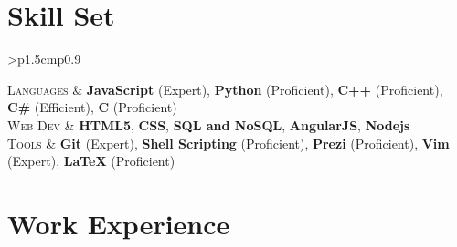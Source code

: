 \documentclass[a4paper,10pt]{article} %
\newcommand{\itemlist}[1]{
    \begin{tabular}{>{\raggedleft}p{1.5cm}p{0.9\linewidth}}
        #1
    \end{tabular}
}
\begin{document}
\section{Skill Set}

\itemlist {
    \textsc{Languages} %
            & \textbf{JavaScript} (Expert), \textbf{Python} (Proficient), \textbf{C++} (Proficient), \textbf{C\#} (Efficient),
              \textbf{C} (Proficient)\\
    \textsc{Web Dev} %
            & \textbf{HTML5}, \textbf{CSS}, \textbf{SQL and NoSQL}, \textbf{AngularJS}, \textbf{Nodejs}\\
    \textsc{Tools} %
            & \textbf{Git} (Expert), \textbf{Shell Scripting} (Proficient), \textbf{Prezi} (Proficient), \textbf{Vim} (Expert), \textbf{LaTeX}
              (Proficient)\\
}


\section{Work Experience}
\end{document}
